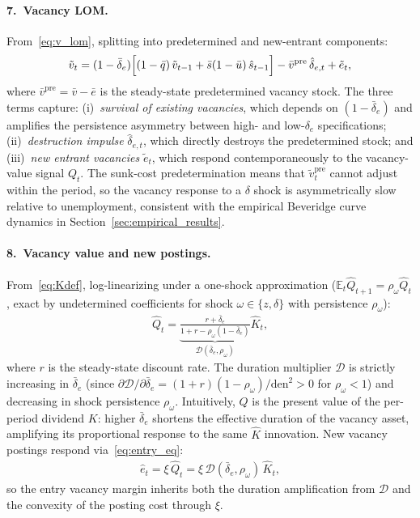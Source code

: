 \documentclass[authoryear, review, 12pt]{elsarticle}
\begin{document}
\paragraph{7.\ Vacancy LOM.}
From~\eqref{eq:v_lom}, splitting into predetermined and new-entrant
components:
\begin{align}\label{eq:v_ll}
    \tilde{v}_t
    = (1-\bar\delta_e)\Bigl[(1-\bar{q})\,\tilde{v}_{t-1}
      + \bar{s}(1-\bar{u})\,\hat{s}_{t-1}\Bigr]
    - \bar{v}^{\mathrm{pre}}\,\hat\delta_{e,t}
    + \tilde{e}_t,
\end{align}
where $\bar{v}^{\mathrm{pre}} = \bar{v}-\bar{e}$ is the steady-state predetermined vacancy stock.
The three terms capture: (i)~\emph{survival of existing vacancies}, which
depends on $(1-\bar\delta_e)$ and amplifies the persistence asymmetry
between high- and low-$\delta_e$ specifications; (ii)~\emph{destruction
impulse} $\hat\delta_{e,t}$, which directly destroys the predetermined stock;
and (iii)~\emph{new entrant vacancies} $\tilde{e}_t$, which respond
contemporaneously to the vacancy-value signal $Q_t$.
The sunk-cost predetermination means that $\tilde{v}_t^{\mathrm{pre}}$
cannot adjust within the period, so the vacancy response to a $\delta$ shock
is asymmetrically slow relative to unemployment, consistent with the
empirical Beveridge curve dynamics in Section~\ref{sec:empirical_results}.

\paragraph{8.\ Vacancy value and new postings.}
From~\eqref{eq:Kdef}, log-linearizing under a one-shock approximation
($\mathbb{E}_t\hat{Q}_{t+1}=\rho_\omega\hat{Q}_t$, exact by undetermined
coefficients for shock $\omega\in\{z,\delta\}$ with persistence $\rho_\omega$):
\begin{align}\label{eq:Q_ll2}
    \hat{Q}_t
    = \underbrace{\frac{r+\bar\delta_e}{1+r-\rho_\omega(1-\bar\delta_e)}}_{\displaystyle\mathcal{D}(\bar\delta_e,\rho_\omega)}\hat{K}_t,
\end{align}
where $r$ is the steady-state discount rate.  The duration multiplier
$\mathcal{D}$ is strictly increasing in $\bar\delta_e$ (since
$\partial\mathcal{D}/\partial\bar\delta_e = (1+r)(1-\rho_\omega)/\mathrm{den}^2>0$
for $\rho_\omega<1$) and decreasing in shock persistence $\rho_\omega$.
Intuitively, $Q$ is the present value of the per-period dividend $K$: higher
$\bar\delta_e$ shortens the effective duration of the vacancy asset,
amplifying its proportional response to the same $\hat{K}$ innovation.
New vacancy postings respond via~\eqref{eq:entry_eq}:
\begin{align}\label{eq:e_ll}
    \hat{e}_t = \xi\,\hat{Q}_t = \xi\,\mathcal{D}(\bar\delta_e,\rho_\omega)\,\hat{K}_t,
\end{align}
so the entry vacancy margin inherits both the duration amplification from
$\mathcal{D}$ and the convexity of the posting cost through $\xi$.
\end{document}
